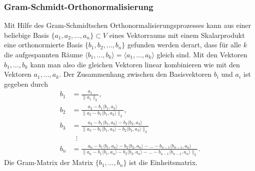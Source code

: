 \subsubsection{Gram-Schmidt-Orthonormalisierung}
Mit Hilfe des Gram-Schmidtschen Orthonormalisierungsprozesses kann aus
einer beliebige Basis $\{a_1,a_2,\dots,a_n\}\subset V$ eines Vektorraums
mit einem Skalarprodukt eine orthonormierte Basis 
$\{b_1,b_2,\dots,b_n\}$ gefunden werden derart, dass für alle $k$
die aufgespannten Räume
$\langle b_1,\dots,b_k\rangle = \langle a_1,\dots ,a_k\rangle$
gleich sind.
%
Mit den Vektoren $b_1,\dots,b_k$ kann man also die gleichen Vektoren
linear kombinieren wie mit den Vektoren $a_1,\dots,a_k$.
Der Zusammenhang zwischen den Basisvektoren $b_i$ und $a_i$ ist
gegeben durch
\begin{align*}
b_1&=\frac{a_1}{\|a_1\|_2},
\\
b_2&=\frac{a_2-b_1\langle b_1,a_2\rangle}{\|a_2-b_1\langle b_1,a_2\rangle\|_2},
\\
b_3&=\frac{a_3-b_1\langle b_1,a_3\rangle-b_2\langle b_2,a_3\rangle}{\|a_3-b_1\langle b_1,a_3\rangle-b_2\langle b_2,a_3\rangle\|_2}
\\
&\phantom{n}\vdots\\
b_n
&=
\frac{
a_n-b_1\langle b_1,a_n\rangle-b_2\langle b_2,a_n\rangle
-\dots-b_{n-1}\langle b_{n-1},a_n\rangle
}{
\|
a_n-b_1\langle b_1,a_n\rangle-b_2\langle b_2,a_n\rangle
-\dots-b_{n-1}\langle b_{n-1},a_n\rangle
\|_2
}.
\end{align*}
Die Gram-Matrix der Matrix $\{b_1,\dots,b_n\}$ ist die Einheitsmatrix.

